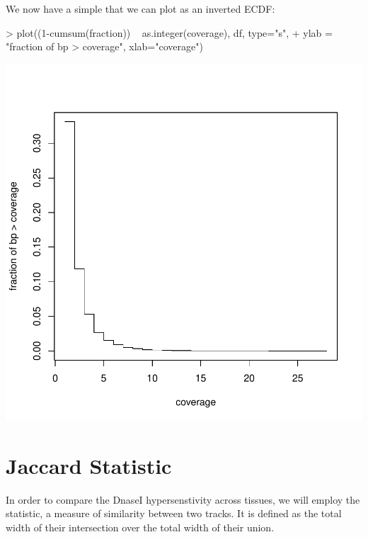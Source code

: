 \documentclass[10pt]{article}
\begin{document}
We now have a simple  that we can plot as an
inverted ECDF:
\begin{Schunk}
\begin{Sinput}
> plot((1-cumsum(fraction)) ~ as.integer(coverage), df, type="s",
+      ylab = "fraction of bp > coverage", xlab="coverage")
\end{Sinput}
\end{Schunk}
\includegraphics{tutorial-coalescence-plot}

\section{Jaccard Statistic}

In order to compare the DnaseI hypersenstivity across tissues, we will
employ the  statistic, a measure of
similarity between two tracks. It is defined as the total width of
their intersection over the total width of their union.
\end{document}
